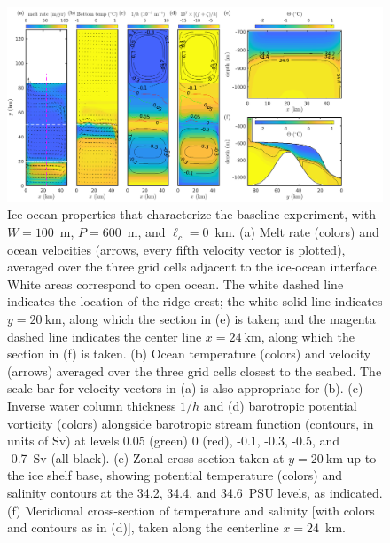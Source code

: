 \documentclass[draft]{agujournal2019}
\begin{document}
\begin{figure}
    \centering
    \includegraphics[width = \textwidth]{../make_figures/plots/figure3.png}
    \caption{Ice-ocean properties that characterize the baseline experiment, with $W = 100$~m, $P = 600$~m, and $\ell_c = 0$~km. (a) Melt rate (colors) and ocean velocities (arrows, every fifth velocity vector is plotted), averaged over the three grid cells adjacent to the ice-ocean interface. White areas correspond to open ocean. The white dashed line indicates the location of the ridge crest; the white solid line indicates $y=20~\text{km}$, along which the section in (e) is taken; and the magenta dashed line indicates the center line $x = 24~\text{km}$, along which the section in (f) is taken. (b) Ocean temperature (colors) and velocity (arrows) averaged over the three grid cells closest to the seabed. The scale bar for velocity vectors in (a) is also appropriate for (b). (c) Inverse water column thickness $1/h$  and (d) barotropic potential vorticity (colors) alongside barotropic stream function (contours, in units of Sv) at levels 0.05 (green) 0 (red), -0.1, -0.3, -0.5, and -0.7~Sv (all black). (e) Zonal cross-section taken at $y=20~\text{km}$ up to the ice shelf base, showing potential temperature (colors) and salinity contours at the 34.2, 34.4, and 34.6~PSU levels, as indicated. (f) Meridional cross-section of temperature and salinity [with colors and contours as in (d)], taken along the centerline $x = 24$~km.}
    \label{fig:figure3}
\end{figure}
\end{document}
